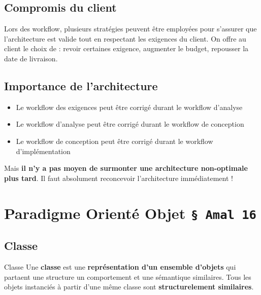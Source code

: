 \documentclass[16pt]{report}
\begin{document}
\begin{multicols*}{2}
        \section{Compromis du client}
        Lors des workflow, plusieurs stratégies peuvent être employées pour s'assurer que l'architecture 
        est valide tout en respectant les exigences du client. 
        On offre au client le choix de : revoir certaines exigence, augmenter le budget, repousser la date 
        de livraison. 

            \section{Importance de l'architecture}

            \begin{itemize}
                \item Le workflow des exigences peut être corrigé durant 
                    le workflow d’analyse 
                \item Le workflow d’analyse peut être corrigé durant le workflow de 
                    conception
                \item Le workflow de conception peut être corrigé durant le 
                    workflow d’implémentation
            \end{itemize}

            Mais \textbf{il n’y a pas moyen de surmonter une architecture non-optimale plus tard}. 
            Il faut absolument reconcevoir l’architecture immédiatement !


            \chapter{Paradigme Orienté Objet \texttt{\S \; Amal 16}}  


            \section{Classe}
            \begin{Definitionx}{Classe}{}
                Une \textbf{classe} est une \textbf{représentation d'un ensemble d'objets} qui 
                partaent une \textcolor{myb}{structure} un \textcolor{myb}{comportement} et 
                une \textcolor{myb}{sémantique} similaires. Tous les objets instanciés à partir d'une même classe 
                sont \textbf{structurelement similaires}.  
            \end{Definitionx}



\end{multicols*}
\end{document}
